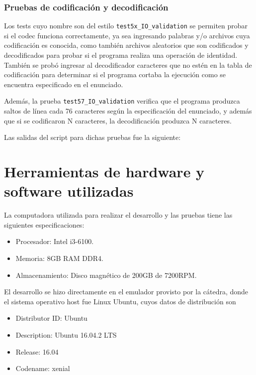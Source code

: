 \subsubsection{Pruebas de codificación y decodificación}

Los tests cuyo nombre son del estilo \texttt{test5x\_IO\_validation} se permiten probar si el codec funciona correctamente, ya sea ingresando palabras y/o archivos cuya codificación es conocida, como también archivos aleatorios que son codificados y decodificados para probar si el programa realiza una operación de identidad. También se probó ingresar al decodificador caracteres que no estén en la tabla de codificación para determinar si el programa cortaba la ejecución como se encuentra especificado en el enunciado.

Además, la prueba \texttt{test57\_IO\_validation} verifica que el programa produzca saltos de línea cada 76 caracteres según la especificación del enunciado, y además que si se codificaron N caracteres, la decodificación produzca N caracteres.

Las salidas del script para dichas pruebas fue la siguiente:



\clearpage

\section{Herramientas de hardware y software utilizadas}\label{sec_tools}

La computadora utilizada para realizar el desarrollo y las pruebas tiene las siguientes especificaciones:
\begin{itemize}
	\item Procesador: Intel i3-6100.
	\item Memoria: 8GB RAM DDR4.
	\item Almacenamiento: Disco magnético de 200GB de 7200RPM.
\end{itemize}

El desarrollo se hizo directamente en el emulador provisto por la cátedra, donde el sistema operativo host fue Linux Ubuntu, cuyos datos de distribución son 
\begin{itemize}
	\item Distributor ID: Ubuntu
	\item Description: Ubuntu 16.04.2 LTS
	\item Release: 16.04
	\item Codename: xenial
\end{itemize}

